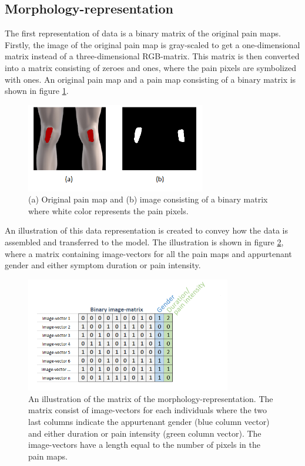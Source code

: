 \subsection{Morphology-representation} \label{sec:Morph}
The first representation of data is a binary matrix of the original pain maps.
Firstly, the image of the original pain map is gray-scaled to get a one-dimensional matrix instead of a three-dimensional RGB-matrix. This matrix is then converted into a matrix consisting of zeroes and ones, where the pain pixels are symbolized with ones. An original pain map and a pain map consisting of a binary matrix is shown in figure \ref{fig:cropbin7}.

\begin{figure} [H]
\centering
\includegraphics[width=0.7\textwidth]{figures/cropbin7}
\caption{(a) Original pain map and (b) image consisting of a binary matrix where white color represents the pain pixels.}
\label{fig:cropbin7}
\end{figure}

\noindent
An illustration of this data representation is created to convey how the data is assembled and transferred to the model. The illustration is shown in figure \ref{fig:binmatrix}, where a matrix containing image-vectors for all the pain maps and appurtenant gender and either symptom duration or pain intensity. 

\begin{figure} [H]
\centering
\includegraphics[width=0.8\textwidth]{figures/binaryimagematrix}
\caption{An illustration of the matrix of the morphology-representation. The matrix consist of image-vectors for each individuals where the two last columns indicate the appurtenant gender (blue column vector) and either duration or pain intensity (green column vector). The image-vectors have a length equal to the number of pixels in the pain maps.}
\label{fig:binmatrix}
\end{figure}


